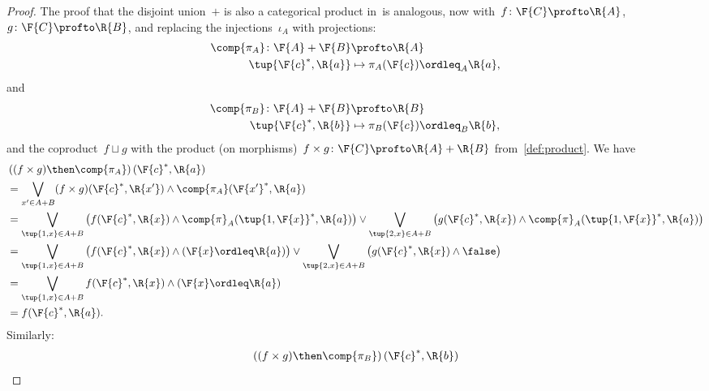 \begin{proof}
    The proof that the disjoint union~$+$ is also a categorical product in~\DP is analogous, now with~$f \colon \F{C} \profto \R{A}$,~$g \colon \F{C} \profto \R{B}$, and replacing the injections~$\iota_A$ with projections:
    \begin{equation}
        \begin{aligned}
            \comp{\pi_A} \colon \F{A}+\F{B} &\profto \R{A}\\
            \tup{\F{c}^*,\R{a}}&\mapsto \pi_A(\F{c})\ordleq_A \R{a},
        \end{aligned}
    \end{equation}
    and
    \begin{equation}
        \begin{aligned}
            \comp{\pi_B} \colon \F{A}+\F{B} &\profto \R{B}\\
            \tup{\F{c}^*,\R{b}}&\mapsto \pi_B(\F{c})\ordleq_B \R{b},
        \end{aligned}
    \end{equation}
    and the coproduct~$f \sqcup g$ with the product (on morphisms)~$f \times g \colon \F{C} \profto \R{A} + \R{B}$ from~\cref{def:product}. We have
    \begin{equation}
        \begin{aligned}
            &\left((f\times g)\then \comp{\pi_A}\right)(\F{c}^*,\R{a})\\
            &=\bigvee_{x'\in A+B} (f\times g)(\F{c}^*,\R{x'}) \wedge \comp{\pi_A}(\F{x'}^*,\R{a})\\
            &=\bigvee_{\tup{1,x}\in A+B}\left( f(\F{c}^*,\R{x}) \wedge \comp{\pi}_A(\tup{1,\F{x}}^*,\R{a})\right) \vee
            \bigvee_{\tup{2,x}\in A+B}\left( g(\F{c}^*,\R{x}) \wedge \comp{\pi}_A(\tup{1,\F{x}}^*,\R{a})\right)\\
            &=\bigvee_{\tup{1,x}\in A+B}\left( f(\F{c}^*,\R{x}) \wedge (\F{x}\ordleq \R{a})\right) \vee
            \bigvee_{\tup{2,x}\in A+B}\left( g(\F{c}^*,\R{x}) \wedge \false \right)\\
            &=\bigvee_{\tup{1,x}\in A+B} f(\F{c}^*,\R{x}) \wedge (\F{x}\ordleq \R{a})\\
            &=f(\F{c}^*,\R{a}).
        \end{aligned}
    \end{equation}
    Similarly:
    \begin{equation}
        \begin{aligned}
            &\left((f\times g)\then \comp{\pi_B}\right)(\F{c}^*,\R{b})\\

\end{aligned}
\end{equation}
\end{proof}
